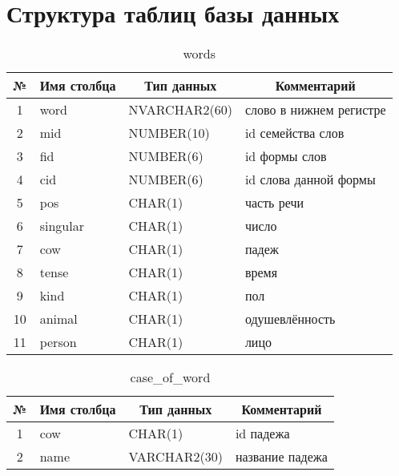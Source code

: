\documentclass[main]{subfiles}
\begin{document}
\section{Структура таблиц базы данных}\label{app:A}
\begin{table}[!h]
	\begin{center}
		\captionsetup{format=hang,labelsep = endash, singlelinecheck=false}
		\caption{words}
		\begin{tabular}{|c|l|l|l|}
			\hline
			\textbf{№} & \multicolumn{1}{c|}{\textbf{Имя столбца}} & \multicolumn{1}{c|}{\textbf{Тип данных}} & \multicolumn{1}{c|}{\textbf{Комментарий}} \\ \hline
			1& word &NVARCHAR2(60) & слово в нижнем регистре\\ \hline
			2&mid& NUMBER(10) & id семейства слов  \\ \hline
			3&fid&NUMBER(6)& id формы слов\\ \hline
			4&cid&NUMBER(6)& id слова данной формы\\ \hline
			5&pos&CHAR(1)& часть речи\\ \hline
			6&singular&CHAR(1)& число \\ \hline
			7&cow &CHAR(1)&падеж \\ \hline
			8&tense &  CHAR(1)& время\\ \hline
			9&kind& CHAR(1)& пол\\ \hline
			10&animal&CHAR(1)&одушевлённость \\ \hline
			11&person&CHAR(1)& лицо \\ \hline
		\end{tabular}
	\end{center}
\end{table}
\begin{table}[!h]
	\begin{center}
		\captionsetup{format=hang,labelsep = endash, singlelinecheck=false}
		\caption{case\_of\_word}
		\begin{tabular}{|c|l|l|l|}
			\hline
			\textbf{№} & \multicolumn{1}{c|}{\textbf{Имя столбца}} & \multicolumn{1}{c|}{\textbf{Тип данных}} & \multicolumn{1}{c|}{\textbf{Комментарий}} \\ \hline
			1&cow &CHAR(1) & id падежа \\ \hline
			2& name& VARCHAR2(30) & название падежа \\ \hline
		\end{tabular}
	\end{center}
\end{table}
\end{document}
